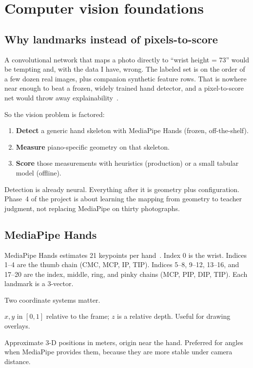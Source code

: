 \documentclass[11pt,a4paper]{article}
\begin{document}
\section{Computer vision foundations}
\label{sec:cv}

\subsection{Why landmarks instead of pixels-to-score}

A convolutional network that maps a photo directly to \enquote{wrist height = 73} would be tempting and, with the data I have, wrong.
The labeled set is on the order of a few dozen real images, plus companion synthetic feature rows.
That is nowhere near enough to beat a frozen, widely trained hand detector, and a pixel-to-score net would throw away explainability~\cite{mlupgrade}.

So the vision problem is factored:

\begin{enumerate}
  \item \textbf{Detect} a generic hand skeleton with MediaPipe Hands (frozen, off-the-shelf).
  \item \textbf{Measure} piano-specific geometry on that skeleton.
  \item \textbf{Score} those measurements with heuristics (production) or a small tabular model (offline).
\end{enumerate}

Detection is already neural.
Everything after it is geometry plus configuration.
Phase~4 of the project is about learning the mapping from geometry to teacher judgment, not replacing MediaPipe on thirty photographs.

\subsection{MediaPipe Hands}

MediaPipe Hands estimates 21 keypoints per hand~\cite{mediapipe}.
Index 0 is the wrist.
Indices 1--4 are the thumb chain (CMC, MCP, IP, TIP).
Indices 5--8, 9--12, 13--16, and 17--20 are the index, middle, ring, and pinky chains (MCP, PIP, DIP, TIP).
Each landmark is a 3-vector.

Two coordinate systems matter.

\begin{description}[style=nextline,leftmargin=1.2em]
  \item[Image landmarks.] \(x,y\) in \([0,1]\) relative to the frame; \(z\) is a relative depth. Useful for drawing overlays.
  \item[World landmarks.] Approximate 3-D positions in meters, origin near the hand. Preferred for angles when MediaPipe provides them, because they are more stable under camera distance.
\end{description}
\end{document}
